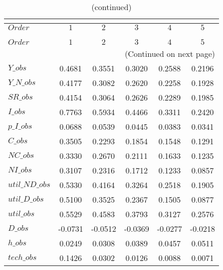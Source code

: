  
\begin{center}
\begin{longtable}{lccccc} 
\caption{COEFFICIENTS OF AUTOCORRELATION}\\
 \label{Table:th_autocorr_matrix}\\
\toprule 
$Order          $	 & 	 $          1$	 & 	 $          2$	 & 	 $          3$	 & 	 $          4$	 & 	 $          5$\\
\midrule \endfirsthead 
\caption{(continued)}\\
 \toprule \\ 
$Order          $	 & 	 $          1$	 & 	 $          2$	 & 	 $          3$	 & 	 $          4$	 & 	 $          5$\\
\midrule \endhead 
\midrule \multicolumn{6}{r}{(Continued on next page)} \\ \bottomrule \endfoot 
\bottomrule \endlastfoot 
$Y\_obs         $	 & 	     0.4681	 & 	     0.3551	 & 	     0.3020	 & 	     0.2588	 & 	     0.2196 \\ 
$Y\_N\_obs      $	 & 	     0.4177	 & 	     0.3082	 & 	     0.2620	 & 	     0.2258	 & 	     0.1928 \\ 
$SR\_obs        $	 & 	     0.4154	 & 	     0.3064	 & 	     0.2626	 & 	     0.2289	 & 	     0.1985 \\ 
$I\_obs         $	 & 	     0.7763	 & 	     0.5934	 & 	     0.4466	 & 	     0.3311	 & 	     0.2420 \\ 
$p\_I\_obs      $	 & 	     0.0688	 & 	     0.0539	 & 	     0.0445	 & 	     0.0383	 & 	     0.0341 \\ 
$C\_obs         $	 & 	     0.3505	 & 	     0.2293	 & 	     0.1854	 & 	     0.1548	 & 	     0.1291 \\ 
$NC\_obs        $	 & 	     0.3330	 & 	     0.2670	 & 	     0.2111	 & 	     0.1633	 & 	     0.1235 \\ 
$NI\_obs        $	 & 	     0.3107	 & 	     0.2316	 & 	     0.1712	 & 	     0.1233	 & 	     0.0857 \\ 
$util\_ND\_obs  $	 & 	     0.5330	 & 	     0.4164	 & 	     0.3264	 & 	     0.2518	 & 	     0.1905 \\ 
$util\_D\_obs   $	 & 	     0.5100	 & 	     0.3525	 & 	     0.2367	 & 	     0.1505	 & 	     0.0877 \\ 
$util\_obs      $	 & 	     0.5529	 & 	     0.4583	 & 	     0.3793	 & 	     0.3127	 & 	     0.2576 \\ 
$D\_obs         $	 & 	    -0.0731	 & 	    -0.0512	 & 	    -0.0369	 & 	    -0.0277	 & 	    -0.0218 \\ 
$h\_obs         $	 & 	     0.0249	 & 	     0.0308	 & 	     0.0389	 & 	     0.0457	 & 	     0.0511 \\ 
$tech\_obs      $	 & 	     0.1426	 & 	     0.0302	 & 	     0.0126	 & 	     0.0088	 & 	     0.0071 \\ 
\end{longtable}
 \end{center}
